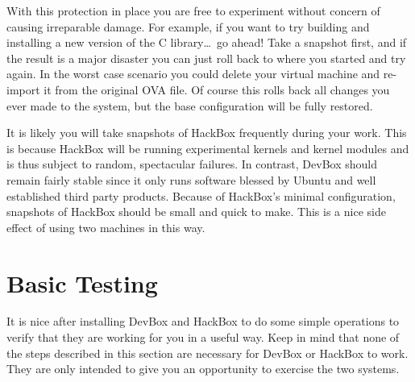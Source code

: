 \documentclass{article}
\begin{document}
With this protection in place you are free to experiment without concern of causing irreparable
damage. For example, if you want to try building and installing a new version of the C
library\ldots\ go ahead! Take a snapshot first, and if the result is a major disaster you can
just roll back to where you started and try again. In the worst case scenario you could delete
your virtual machine and re-import it from the original OVA file. Of course this rolls back all
changes you ever made to the system, but the base configuration will be fully restored.

It is likely you will take snapshots of HackBox frequently during your work. This is because
HackBox will be running experimental kernels and kernel modules and is thus subject to random,
spectacular failures. In contrast, DevBox should remain fairly stable since it only runs
software blessed by Ubuntu and well established third party products. Because of HackBox's
minimal configuration, snapshots of HackBox should be small and quick to make. This is a nice
side effect of using two machines in this way.

\section{Basic Testing}

It is nice after installing DevBox and HackBox to do some simple operations to verify that they
are working for you in a useful way. Keep in mind that none of the steps described in this
section are necessary for DevBox or HackBox to work. They are only intended to give you an
opportunity to exercise the two systems.
\end{document}
